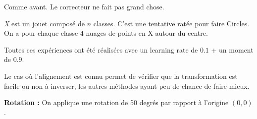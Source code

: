 Comme avant. Le correcteur ne fait pas grand chose.



\emph{X} est un jouet composé de $n$ classes. C'est une tentative ratée pour faire Circles.
On a pour chaque classe 4 nuages de points en X autour du centre.

Toutes ces expériences ont été réalisées avec un learning rate de $0.1$ + un moment de $0.9$.


Le cas où l'alignement est connu permet de vérifier que la transformation est facile ou non 
à inverser, les autres méthodes ayant peu de chance de faire mieux.


{\Large \textbf{Rotation :}} On applique une rotation de 50 degrés par rapport à l'origine $(0,0)$.

